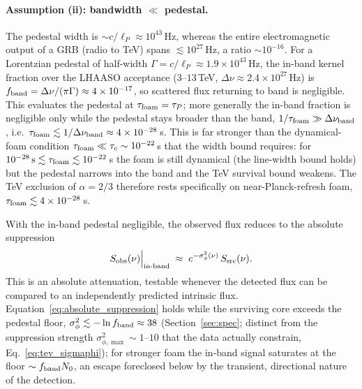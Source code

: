 \documentclass[aps,prd,onecolumn,amsmath,amssymb]{revtex4-2}
\begin{document}
\paragraph{Assumption (ii): bandwidth $\ll$ pedestal.}  The pedestal width is
$\sim c/\ell_P\approx10^{43}$\,Hz, whereas the entire electromagnetic
output of a GRB (radio to TeV) spans $\lesssim10^{27}$\,Hz, a ratio
$\sim10^{-16}$.  For a Lorentzian pedestal of half-width
$\Gamma=c/\ell_P\approx1.9\times10^{43}$\,Hz, the in-band kernel fraction
over the LHAASO acceptance ($3$--$13$\,TeV, $\Delta\nu\approx2.4\times10^{27}$\,Hz)
is $f_{\rm band}=\Delta\nu/(\pi\Gamma)\approx4\times10^{-17}$, so
scattered flux returning to band is negligible.  This evaluates the
pedestal at $\tau_{\rm foam}=\tau_P$; more generally the in-band fraction
is negligible only while the pedestal stays broader than the band,
$1/\tau_{\rm foam}\gg\Delta\nu_{\rm band}$, i.e.\
$\tau_{\rm foam}\lesssim1/\Delta\nu_{\rm band}\approx4\times10^{-28}$\,s.
This is far stronger than the dynamical-foam condition
$\tau_{\rm foam}\ll\tau_c\sim10^{-22}$\,s that the width bound requires: for
$10^{-28}\,{\rm s}\lesssim\tau_{\rm foam}\lesssim10^{-22}$\,s the foam is
still dynamical (the line-width bound holds) but the pedestal narrows into
the band and the TeV survival bound weakens.  The TeV exclusion of
$\alpha=2/3$ therefore rests specifically on near-Planck-refresh foam,
$\tau_{\rm foam}\lesssim4\times10^{-28}$\,s.

With the in-band pedestal negligible, the observed flux reduces to the
absolute suppression
\begin{equation}
  S_{\rm obs}(\nu)\Big|_{\rm in\text{-}band}
    \;\approx\; e^{-\sigma_\phi^2(\nu)}\,S_{\rm src}(\nu).
  \label{eq:absolute_suppression}
\end{equation}
This is an absolute attenuation, testable whenever the detected flux can
be compared to an independently predicted intrinsic flux.
Equation~\eqref{eq:absolute_suppression} holds while the surviving core
exceeds the pedestal floor, $\sigma_\phi^2\lesssim-\ln f_{\rm band}\approx38$
(Section~\ref{sec:spec}; distinct from the suppression strength
$\sigma_{\phi,\max}^2\sim1$--$10$ that the data actually constrain,
Eq.~\eqref{eq:tev_sigmaphi}); for stronger foam the in-band signal saturates at
the floor $\sim f_{\rm band}N_0$, an escape foreclosed below by the
transient, directional nature of the detection.
\end{document}
